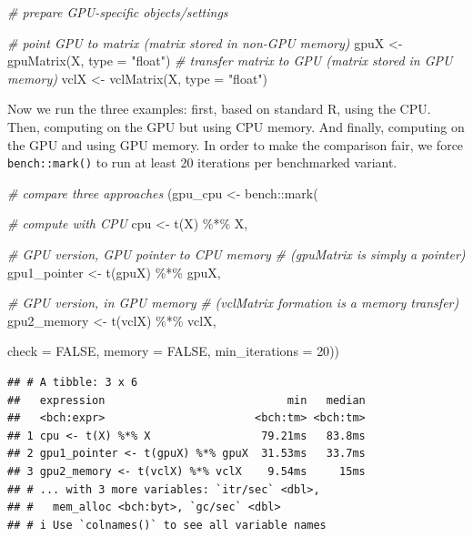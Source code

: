\documentclass[
  12pt,
]{style/krantz}
\newenvironment{Shaded}{\begin{snugshade}}{\end{snugshade}}
\newcommand{\AttributeTok}[1]{\textcolor[rgb]{0.77,0.63,0.00}{#1}}
\newcommand{\CommentTok}[1]{\textcolor[rgb]{0.56,0.35,0.01}{\textit{#1}}}
\newcommand{\ConstantTok}[1]{\textcolor[rgb]{0.00,0.00,0.00}{#1}}
\newcommand{\DecValTok}[1]{\textcolor[rgb]{0.00,0.00,0.81}{#1}}
\newcommand{\FunctionTok}[1]{\textcolor[rgb]{0.00,0.00,0.00}{#1}}
\newcommand{\NormalTok}[1]{#1}
\newcommand{\OtherTok}[1]{\textcolor[rgb]{0.56,0.35,0.01}{#1}}
\newcommand{\SpecialCharTok}[1]{\textcolor[rgb]{0.00,0.00,0.00}{#1}}
\newcommand{\StringTok}[1]{\textcolor[rgb]{0.31,0.60,0.02}{#1}}
\begin{document}
\begin{Shaded}
\begin{Highlighting}[]
\CommentTok{\# prepare GPU{-}specific objects/settings}

\CommentTok{\# point GPU to matrix (matrix stored in non{-}GPU memory)}
\NormalTok{gpuX }\OtherTok{\textless{}{-}} \FunctionTok{gpuMatrix}\NormalTok{(X, }\AttributeTok{type =} \StringTok{"float"}\NormalTok{)}
\CommentTok{\# transfer matrix to GPU (matrix stored in GPU memory)}
\NormalTok{vclX }\OtherTok{\textless{}{-}} \FunctionTok{vclMatrix}\NormalTok{(X, }\AttributeTok{type =} \StringTok{"float"}\NormalTok{)  }
\end{Highlighting}
\end{Shaded}

Now we run the three examples: first, based on standard R, using the CPU. Then, computing on the GPU but using CPU memory. And finally, computing on the GPU and using GPU memory. In order to make the comparison fair, we force \texttt{bench::mark()} to run at least 20 iterations per benchmarked variant.

\begin{Shaded}
\begin{Highlighting}[]
\CommentTok{\# compare three approaches}
\NormalTok{(gpu\_cpu }\OtherTok{\textless{}{-}}\NormalTok{ bench}\SpecialCharTok{::}\FunctionTok{mark}\NormalTok{(}
  
  \CommentTok{\# compute with CPU }
\NormalTok{  cpu }\OtherTok{\textless{}{-}} \FunctionTok{t}\NormalTok{(X) }\SpecialCharTok{\%*\%}\NormalTok{ X,}
  
  \CommentTok{\# GPU version, GPU pointer to CPU memory }
  \CommentTok{\# (gpuMatrix is simply a pointer)}
\NormalTok{  gpu1\_pointer }\OtherTok{\textless{}{-}} \FunctionTok{t}\NormalTok{(gpuX) }\SpecialCharTok{\%*\%}\NormalTok{ gpuX,}
  
  \CommentTok{\# GPU version, in GPU memory }
  \CommentTok{\# (vclMatrix formation is a memory transfer)}
\NormalTok{  gpu2\_memory }\OtherTok{\textless{}{-}} \FunctionTok{t}\NormalTok{(vclX) }\SpecialCharTok{\%*\%}\NormalTok{ vclX,}
 
\AttributeTok{check =} \ConstantTok{FALSE}\NormalTok{, }\AttributeTok{memory =} \ConstantTok{FALSE}\NormalTok{, }\AttributeTok{min\_iterations =} \DecValTok{20}\NormalTok{))}
\end{Highlighting}
\end{Shaded}

\begin{verbatim}
## # A tibble: 3 x 6
##   expression                            min   median
##   <bch:expr>                       <bch:tm> <bch:tm>
## 1 cpu <- t(X) %*% X                 79.21ms   83.8ms
## 2 gpu1_pointer <- t(gpuX) %*% gpuX  31.53ms   33.7ms
## 3 gpu2_memory <- t(vclX) %*% vclX    9.54ms     15ms
## # ... with 3 more variables: `itr/sec` <dbl>,
## #   mem_alloc <bch:byt>, `gc/sec` <dbl>
## # i Use `colnames()` to see all variable names
\end{verbatim}
\end{document}
